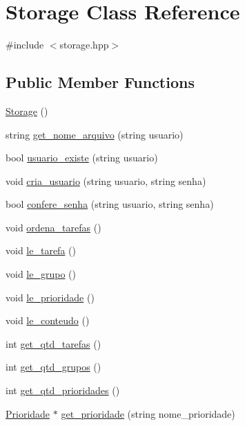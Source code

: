 \hypertarget{classStorage}{}\section{Storage Class Reference}
\label{classStorage}


{\ttfamily \#include $<$storage.\+hpp$>$}

\subsection*{Public Member Functions}
\begin{DoxyCompactItemize}
\item 
\hyperlink{classStorage_a80ef6af5e4c9fd4424ae16e808d05291}{Storage} ()
\item 
string \hyperlink{classStorage_a72004c148e48fdd5fde71db2319762e9}{get\+\_\+nome\+\_\+arquivo} (string usuario)
\item 
bool \hyperlink{classStorage_adb9fc5565d70a106da231654e15cf090}{usuario\+\_\+existe} (string usuario)
\item 
void \hyperlink{classStorage_a572d1e337404b8819f1565be9689a271}{cria\+\_\+usuario} (string usuario, string senha)
\item 
bool \hyperlink{classStorage_af2d39c70a0cd9d63959ab90c9f039dee}{confere\+\_\+senha} (string usuario, string senha)
\item 
void \hyperlink{classStorage_a4d149db70dfa838a52ad53bb22555050}{ordena\+\_\+tarefas} ()
\item 
void \hyperlink{classStorage_a0b13d6c7e111f6bbeb4c6c03feb532c9}{le\+\_\+tarefa} ()
\item 
void \hyperlink{classStorage_a571f009d0dca33811883d381a70ccda5}{le\+\_\+grupo} ()
\item 
void \hyperlink{classStorage_aac1b536c28c1bd7a3bef1f0b8738f8d2}{le\+\_\+prioridade} ()
\item 
void \hyperlink{classStorage_a2e74fd83ed4bcaad391af72e8cd569c1}{le\+\_\+conteudo} ()
\item 
int \hyperlink{classStorage_aa42ca5fe247fbc390ca86c4a05346daa}{get\+\_\+qtd\+\_\+tarefas} ()
\item 
int \hyperlink{classStorage_ae92552f01f0e393d4168f6e159a0ca12}{get\+\_\+qtd\+\_\+grupos} ()
\item 
int \hyperlink{classStorage_a3ab42001bc5be1d4607fb5b24157c85d}{get\+\_\+qtd\+\_\+prioridades} ()
\item 
\hyperlink{classPrioridade}{Prioridade} $\ast$ \hyperlink{classStorage_aeb09b13da8b70a5bc279197d7298de06}{get\+\_\+prioridade} (string nome\+\_\+prioridade)

\end{DoxyCompactItemize}
